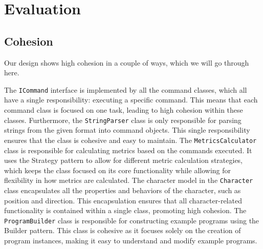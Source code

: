 \documentclass[11pt,a4paper]{article}
\begin{document}

\section*{Evaluation}

\subsection*{Cohesion}

Our design shows high cohesion in a couple of ways, which we will go through here. 

The \texttt{ICommand} interface is implemented by all the command classes, which all have a single responsibility: executing a specific command. This means that each command class is focused on one task, leading to high cohesion within these classes.
Furthermore, the \texttt{StringParser} class is only responsible for parsing strings from the given format into command objects. This single responsibility ensures that the class is cohesive and easy to maintain.
The \texttt{MetricsCalculator} class is responsible for calculating metrics based on the commands executed. It uses the Strategy pattern to allow for different metric calculation strategies, which keeps the class focused on its core functionality while allowing for flexibility in how metrics are calculated.
The character model in the \texttt{Character} class encapsulates all the properties and behaviors of the character, such as position and direction. This encapsulation ensures that all character-related functionality is contained within a single class, promoting high cohesion.
The \texttt{ProgramBuilder} class is responsible for constructing example programs using the Builder pattern. This class is cohesive as it focuses solely on the creation of program instances, making it easy to understand and modify example programs. 
\end{document}
